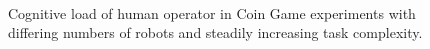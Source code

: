 \documentclass{sig-alternate}
\begin{document}
\begin{figure}  
\centering
{}\\
\caption{Cognitive load of human operator in Coin Game experiments with differing numbers of robots and steadily increasing task complexity.}
\label{fig:final-results}
\end{figure}



\end{document}
